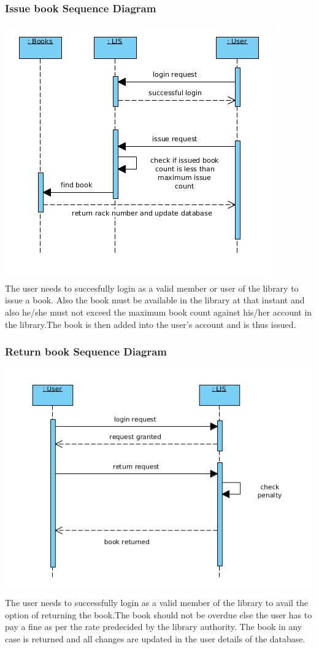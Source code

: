 \documentclass[a4paper]{article}
\begin{document}
\subsubsection*{Issue book Sequence Diagram}
\includegraphics[scale=0.50]{images/seqDiagIssueBook.png}
\\
The user needs to succesfully login as a valid member or user of the library to issue a book. Also the book must be available in the library at that instant and also he/she must not exceed the maximum book count against his/her account in the library.The book is then added into the user's account and is thus issued.\\

\subsubsection*{Return book Sequence Diagram}
\includegraphics[scale=0.50]{images/seqDiagReturnBook.png}
\\
The user needs to successfully login as a valid member of the library to avail the option of returning the book.The book should not be overdue else the user has to pay a fine as per the rate predecided by the library authority. The book in any case is returned and all changes are updated in the user details of the database.
\\
\end{document}
